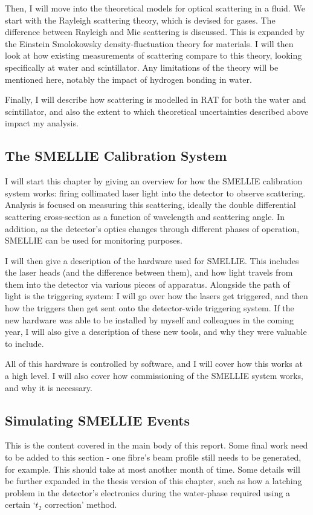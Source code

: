 Then, I will move into the theoretical models for optical scattering in a fluid. We start with the Rayleigh scattering theory, which is devised for gases. The difference between Rayleigh and Mie scattering is discussed. This is expanded by the Einstein Smolokowsky density-fluctuation theory for materials. I will then look at how existing measurements of scattering compare to this theory, looking specifically at water and scintillator. Any limitations of the theory will be mentioned here, notably the impact of hydrogen bonding in water.

Finally, I will describe how scattering is modelled in RAT for both the water and scintillator, and also the extent to which theoretical uncertainties described above impact my analysis.

\subsection{The SMELLIE Calibration System}
I will start this chapter by giving an overview for how the SMELLIE calibration system works: firing collimated laser light into the detector to observe scattering. Analysis is focused on measuring this scattering, ideally the double differential scattering cross-section as a function of wavelength and scattering angle. In addition, as the detector's optics changes through different phases of operation, SMELLIE can be used for monitoring purposes.

I will then give a description of the hardware used for SMELLIE. This includes the laser heads (and the difference between them), and how light travels from them into the detector via various pieces of apparatus. Alongside the path of light is the triggering system: I will go over how the lasers get triggered, and then how the triggers then get sent onto the detector-wide triggering system. If the new hardware was able to be installed by myself and colleagues in the coming year, I will also give a description of these new tools, and why they were valuable to include.

All of this hardware is controlled by software, and I will cover how this works at a high level. I will also cover how commissioning of the SMELLIE system works, and why it is necessary.

\subsection{Simulating SMELLIE Events}
This is the content covered in the main body of this report. Some final work need to be added to this section - one fibre's beam profile still needs to be generated, for example. This should take at most another month of time. Some details will be further expanded in the thesis version of this chapter, such as how a latching problem in the detector's electronics during the water-phase required using a certain `$t_2$ correction' method.

